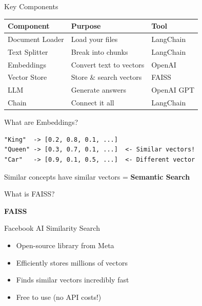 \documentclass[aspectratio=169]{beamer}
\begin{document}
\begin{frame}{Key Components}
    \begin{table}
        \centering
        \begin{tabular}{|l|l|l|}
            \hline
            \textbf{Component} & \textbf{Purpose} & \textbf{Tool} \\
            \hline
            Document Loader & Load your files & LangChain \\
            \hline
            Text Splitter & Break into chunks & LangChain \\
            \hline
            Embeddings & Convert text to vectors & OpenAI \\
            \hline
            Vector Store & Store \& search vectors & FAISS \\
            \hline
            LLM & Generate answers & OpenAI GPT \\
            \hline
            Chain & Connect it all & LangChain \\
            \hline
        \end{tabular}
    \end{table}
\end{frame}

\begin{frame}[fragile]{What are Embeddings?}
    \begin{tcolorbox}[colback=ragblue!10, colframe=ragblue, title=Embeddings = Numbers that capture meaning]
\begin{verbatim}
"King"  -> [0.2, 0.8, 0.1, ...]
"Queen" -> [0.3, 0.7, 0.1, ...]  <- Similar vectors!
"Car"   -> [0.9, 0.1, 0.5, ...]  <- Different vector
\end{verbatim}
    \end{tcolorbox}

    \vspace{1em}

    \begin{center}
        \Large Similar concepts have similar vectors = \textbf{\textcolor{ragpurple}{Semantic Search}}
    \end{center}
\end{frame}

\begin{frame}{What is FAISS?}
    \begin{center}
        \Huge\textbf{FAISS}

        \large Facebook AI Similarity Search
    \end{center}

    \vspace{1em}

    \begin{itemize}
        \item Open-source library from Meta
        \item Efficiently stores millions of vectors
        \item Finds similar vectors incredibly fast
        \item Free to use (no API costs!)
    \end{itemize}
\end{frame}
\end{document}
